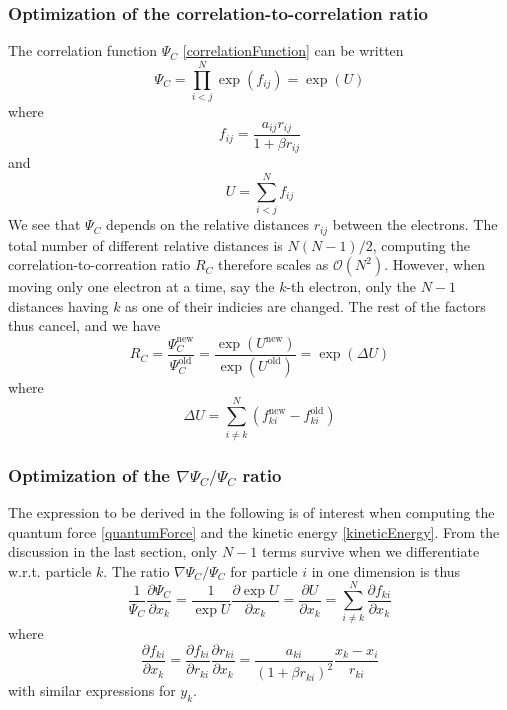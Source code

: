 \documentclass[english, a4paper]{article}
\begin{document}
\subsubsection{Optimization of the correlation-to-correlation ratio}
The correlation function $\Psi_C$ \eqref{correlationFunction} can be written
\begin{equation}
 \Psi_C = \prod_{i<j}^N\exp{(f_{ij})} = \exp(U)
\end{equation}
where 
\begin{equation}
 f_{ij} = \frac{a_{ij}r_{ij}}{1+\beta r_{ij}}
 \label{pade-jastrow}
\end{equation}
and 
\begin{equation}
 U = \sum_{i<j}^Nf_{ij}
\end{equation}
We see that $\Psi_C$ depends on the relative distances $r_{ij}$ between the electrons. The total
number of different relative distances is $N(N-1)/2$, computing the correlation-to-correation ratio
$R_C$ therefore scales as $\mathcal{O}(N^2)$. However, when moving only one electron at a time, say the 
$k$-th electron, only the $N-1$ distances having $k$ as one of their indicies are changed. The 
rest of the factors thus cancel, and we have
\begin{equation}
 R_C = \frac{\Psi_C^{\textrm{new}}}{\Psi_C^{\textrm{old}}} = 
 \frac{\exp{(U^{\textrm{new}})}}{\exp{(U^{\textrm{old}})}} = 
 \exp{(\Delta U)}
\end{equation}
where 
\begin{equation}
 \Delta U = \sum_{i\neq k}^N (f_{ki}^{\textrm{new}} - f_{ki}^{\textrm{old}})
\end{equation}

\subsubsection{Optimization of the $\nabla \Psi_C / \Psi_C$ ratio}
The expression to be derived in the following is of interest when computing the quantum force \eqref{quantumForce}
and the kinetic energy \eqref{kineticEnergy}. From the discussion in the last section, only $N-1$ terms survive
when we differentiate w.r.t. particle $k$. 
The ratio $\nabla \Psi_C / \Psi_C$ for particle $i$
in one dimension is thus
\begin{equation}
\frac{1}{\Psi_C}\frac{\partial \Psi_C}{\partial x_k} = 
\frac{1}{\exp{U}}\frac{\partial \exp{U}}{\partial x_k} = 
\frac{\partial U}{\partial x_k} = 
\sum_{i\neq k}^N \frac{\partial f_{ki}}{\partial x_k}
\end{equation}
where
\begin{equation}
 \frac{\partial f_{ki}}{\partial x_k} = \frac{\partial f_{ki}}{\partial r_{ki}}
 \frac{\partial r_{ki}}{\partial x_k} = \frac{a_{ki}}{(1 + \beta r_{ki})^2}\frac{x_k - x_i}{r_{ki}}
\end{equation}
with similar expressions for $y_k$. 
\end{document}
